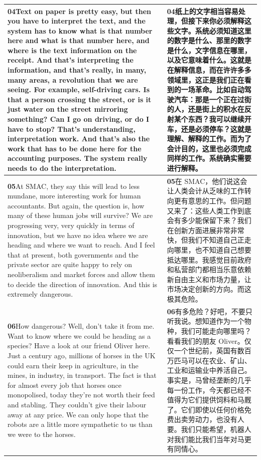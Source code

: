 \documentclass[UTF8,zihao=-4,fontset=fandol]{ctexart}
\newcommand{\TranscriptColumn}{\raggedright\arraybackslash\hyphenpenalty=10000\exhyphenpenalty=10000\sloppy}
\begin{document}
\begin{longtable}{>{\TranscriptColumn}p{} >{\TranscriptColumn}p{}}
\textbf{04}\quad Text on paper is pretty easy, but then you have to interpret the text, and the system has to know what is that number here and what is that number here, and where is the text information on the receipt. And that's interpreting the information, and that's really, in many, many areas, a revolution that we are seeing. For example, self-driving cars. Is that a person crossing the street, or is it just water on the street mirroring something? Can I go on driving, or do I have to stop? That's understanding, interpretation work. And that's also the work that has to be done here for the accounting purposes. The system really needs to do the interpretation. & \textbf{04}\quad 纸上的文字相当容易处理，但接下来你必须解释这些文字。系统必须知道这里的数字是什么、那里的数字是什么，文字信息在哪里，以及它意味着什么。这就是在解释信息，而在许许多多领域里，这正是我们正在看到的一场革命。比如自动驾驶汽车：那是一个正在过街的人，还是街上的积水在反射某个东西？我可以继续开车，还是必须停车？这就是理解、解释的工作。而为了会计目的，这里也必须完成同样的工作。系统确实需要进行解释。 \\ \hline
\textbf{05}\quad At SMAC, they say this will lead to less mundane, more interesting work for human accountants. But again, the question is, how many of these human jobs will survive? We are progressing very, very quickly in terms of innovation, but we have no idea where we are heading and where we want to reach. And I feel that at present, both governments and the private sector are quite happy to rely on neoliberalism and market forces and allow them to decide the direction of innovation. And this is extremely dangerous. & \textbf{05}\quad 在 SMAC，他们说这会让人类会计从乏味的工作转向更有意思的工作。但问题又来了：这些人类工作到底会有多少能保留下来？我们在创新方面进展非常非常快，但我们不知道自己正走向哪里，也不知道自己想要抵达哪里。我感觉目前政府和私营部门都相当乐意依赖新自由主义和市场力量，让市场决定创新的方向。而这极其危险。 \\ \hline
\textbf{06}\quad How dangerous? Well, don't take it from me. Want to know where we could be heading as a species? Have a look at our friend Oliver here. Just a century ago, millions of horses in the UK could earn their keep in agriculture, in the mines, in industry, in transport. The fact is that for almost every job that horses once monopolised, today they're not worth their feed and stabling. They couldn't give their labour away at any price. We can only hope that the robots are a little more sympathetic to us than we were to the horses. & \textbf{06}\quad 有多危险？好吧，不要只听我说。想知道作为一个物种，我们可能走向哪里吗？看看我们的朋友 Oliver。仅仅一个世纪前，英国有数百万匹马可以在农业、矿山、工业和运输业中养活自己。事实是，马曾经垄断的几乎每一份工作，今天都已经不值得为它们提供饲料和马厩了。它们即使以任何价格免费出卖劳动力，也没有人要。我们只能希望，机器人对我们能比我们当年对马更有同情心。 \\ \hline
\end{longtable}
\end{document}
